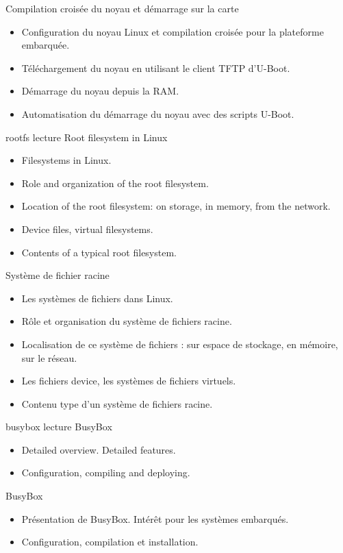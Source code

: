 {Compilation croisée du noyau et démarrage sur la carte}
{
  \begin{itemize}
  \item Configuration du noyau Linux et compilation croisée pour la
    plateforme embarquée.
  \item Téléchargement du noyau en utilisant le client TFTP d'U-Boot.
  \item Démarrage du noyau depuis la RAM.
  \item Automatisation du démarrage du noyau avec des scripts U-Boot.
  \end{itemize}
}
{rootfs}
{lecture}
{Root filesystem in Linux}
{
  \begin{itemize}
  \item Filesystems in Linux.
  \item Role and organization of the root filesystem.
  \item Location of the root filesystem: on storage, in memory,
        from the network.
  \item Device files, virtual filesystems.
  \item Contents of a typical root filesystem.
  \end{itemize}
}
{Système de fichier racine}
{
  \begin{itemize}
  \item Les systèmes de fichiers dans Linux.
  \item Rôle et organisation du système de fichiers racine.
  \item Localisation de ce système de fichiers : sur espace
	de stockage, en mémoire, sur le réseau.
  \item Les fichiers device, les systèmes de fichiers virtuels.
  \item Contenu type d'un système de fichiers racine.
  \end{itemize}
}
{busybox}
{lecture}
{BusyBox}
{
  \begin{itemize}
  \item Detailed overview. Detailed features.
  \item Configuration, compiling and deploying.
  \end{itemize}
}
{BusyBox}
{
  \begin{itemize}
  \item Présentation de BusyBox. Intérêt pour les systèmes embarqués.
  \item Configuration, compilation et installation.
  \end{itemize}
}
